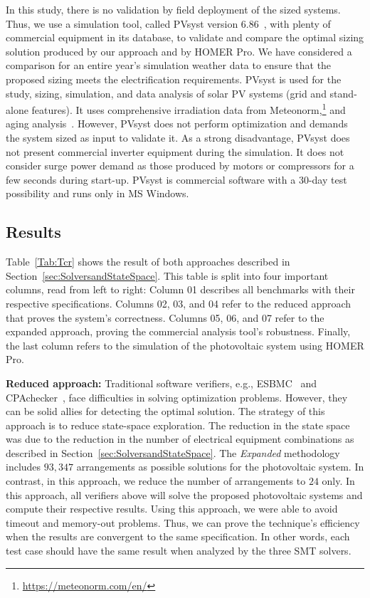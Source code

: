 \documentclass[journal]{IEEEtran}
\begin{document}
In this study, there is no validation by field deployment of the sized systems. Thus, we use a simulation tool, called PVsyst version $6.86$~\cite{PVsyst}, with plenty of commercial equipment in its database, to validate and compare the optimal sizing solution produced by our approach and by HOMER Pro. We have considered a comparison for an entire year's simulation weather data to ensure that the proposed sizing meets the electrification requirements. PVsyst is used for the study, sizing, simulation, and data analysis of solar PV systems (grid and stand-alone features). It uses comprehensive irradiation data from Meteonorm,\footnote{\href{https://meteonorm.com/en/}{https://meteonorm.com/en/}} and aging analysis~\cite{PVsyst2017}. However, PVsyst does not perform optimization and demands the system sized as input to validate it. As a strong disadvantage, PVsyst does not present commercial inverter equipment during the simulation. It does not consider surge power demand as those produced by motors or compressors for a few seconds during start-up. PVsyst is commercial software with a $30$-day test possibility and runs only in MS Windows.

\subsection{Results}

Table~\ref{Tab:Tcr} shows the result of both approaches described in Section~\ref{sec:SolversandStateSpace}. This table is split into four important columns, read from left to right: Column 01 describes all benchmarks with their respective specifications. Columns 02, 03, and 04 refer to the reduced approach that proves the system's correctness. Columns 05, 06, and 07 refer to the expanded approach, proving the commercial analysis tool's robustness. Finally, the last column refers to the simulation of the photovoltaic system using HOMER Pro.

\textbf{Reduced approach:} Traditional software verifiers, e.g., ESBMC~\cite{esbmc2018} and CPAchecker~\cite{Beyer2011}, face difficulties in solving optimization problems. However, they can be solid allies for detecting the optimal solution. The strategy of this approach is to reduce state-space exploration. The reduction in the state space was due to the reduction in the number of electrical equipment combinations as described in Section~\ref{sec:SolversandStateSpace}. The \textit{Expanded} methodology includes $93,347$ arrangements as possible solutions for the photovoltaic system.
In contrast, in this approach, we reduce the number of arrangements to $24$ only. In this approach, all verifiers above will solve the proposed photovoltaic systems and compute their respective results. Using this approach, we were able to avoid timeout and memory-out problems. Thus, we can prove the technique's efficiency when the results are convergent to the same specification. In other words, each test case should have the same result when analyzed by the three SMT solvers.
\end{document}
